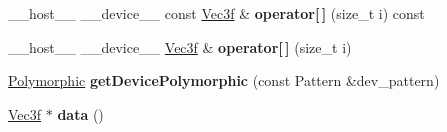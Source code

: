 \begin{DoxyCompactItemize}
\item 
\+\_\+\+\_\+host\+\_\+\+\_\+ \+\_\+\+\_\+device\+\_\+\+\_\+ const \hyperlink{class_vec3}{Vec3f} \& {\bfseries operator\mbox{[}$\,$\mbox{]}} (size\+\_\+t i) const\hypertarget{class_mesh_ace991bdeffafcf1d7d9ceaf6a697e6bd}{}\label{class_mesh_ace991bdeffafcf1d7d9ceaf6a697e6bd}

\item 
\+\_\+\+\_\+host\+\_\+\+\_\+ \+\_\+\+\_\+device\+\_\+\+\_\+ \hyperlink{class_vec3}{Vec3f} \& {\bfseries operator\mbox{[}$\,$\mbox{]}} (size\+\_\+t i)\hypertarget{class_mesh_a2fec73c82d262d4a5b09dc80918c1054}{}\label{class_mesh_a2fec73c82d262d4a5b09dc80918c1054}

\item 
\hyperlink{struct_polymorphic}{Polymorphic} {\bfseries get\+Device\+Polymorphic} (const Pattern \&dev\+\_\+pattern)\hypertarget{class_mesh_a5a6b65787f239cffc60fbf955473b129}{}\label{class_mesh_a5a6b65787f239cffc60fbf955473b129}

\item 
\hyperlink{class_vec3}{Vec3f} $\ast$ {\bfseries data} ()\hypertarget{class_mesh_a4974d2a092f0b34a0e4d0de0cf7f0bac}{}\label{class_mesh_a4974d2a092f0b34a0e4d0de0cf7f0bac}

\end{DoxyCompactItemize}
